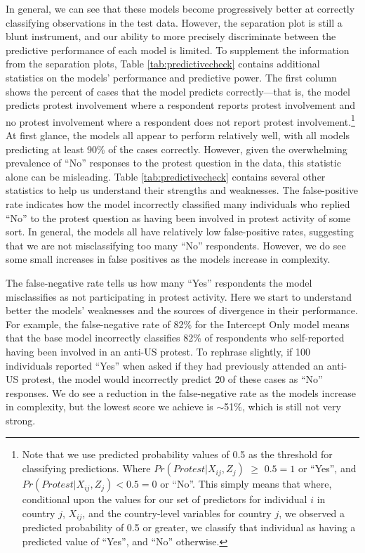 			In general, we can see that these models become progressively better at correctly classifying observations in the test data. However, the separation plot is still a blunt instrument, and our ability to more precisely discriminate between the predictive performance of each model is limited. To supplement the information from the separation plots, Table \ref{tab:predictivecheck} contains additional statistics on the models' performance and predictive power. The first column shows the percent of cases that the model predicts correctly---that is, the model predicts protest involvement where a respondent reports protest involvement and no protest involvement where a respondent does not report protest involvement.\footnote{Note that we use predicted probability values of 0.5 as the threshold for classifying predictions. Where $Pr(Protest | X_{ij}, Z_j)$ $\geq$ $0.5 = 1$ or ``Yes'', and $Pr(Protest | X_{ij}, Z_j) < 0.5 = 0$ or ``No''. This simply means that where, conditional upon the values for our set of predictors for individual $i$ in country $j$, $X_{ij}$, and the country-level variables for country $j$, we observed a predicted probability of 0.5 or greater, we classify that individual as having a predicted value of ``Yes'', and ``No'' otherwise.} At first glance, the models all appear to perform relatively well, with all models predicting at least 90\% of the cases correctly. However, given the overwhelming prevalence of ``No'' responses to the protest question in the data, this statistic alone can be misleading. Table \ref{tab:predictivecheck} contains several other statistics to help us understand their strengths and weaknesses. The false-positive rate indicates how the model incorrectly classified many individuals who replied ``No'' to the protest question as having been involved in protest activity of some sort. In general, the models all have relatively low false-positive rates, suggesting that we are not misclassifying too many ``No'' respondents. However, we do see some small increases in false positives as the models increase in complexity.
			
			The false-negative rate tells us how many ``Yes'' respondents the model misclassifies as not participating in protest activity. Here we start to understand better the models' weaknesses and the sources of divergence in their performance. For example, the false-negative rate of 82\% for the Intercept Only model means that the base model incorrectly classifies 82\% of respondents who self-reported having been involved in an anti-US protest. To rephrase slightly, if 100 individuals reported ``Yes'' when asked if they had previously attended an anti-US protest, the model would incorrectly predict 20 of these cases as ``No'' responses. We do see a reduction in the false-negative rate as the models increase in complexity, but the lowest score we achieve is $\sim$51\%, which is still not very strong.
			
